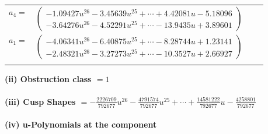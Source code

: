 \documentclass[1p]{elsarticle_modified}
\theoremstyle{definition}
\begin{document}
\begin{tabular}{m{7pt} m{180pt} m{7pt} m{180pt} }
\flushright $a_{4}=$&$\begin{pmatrix}-1.09427 u^{26}-3.45639 u^{25}+\cdots+4.42081 u-5.18096\\-3.64276 u^{26}-4.52291 u^{25}+\cdots-13.9435 u+3.89601\end{pmatrix}$ \\
\flushright $a_{1}=$&$\begin{pmatrix}-4.06341 u^{26}-6.40875 u^{25}+\cdots-8.28744 u+1.23141\\-2.48321 u^{26}-3.27273 u^{25}+\cdots-10.3527 u+2.66927\end{pmatrix}$\\&\end{tabular}
\flushleft \textbf{(ii) Obstruction class $= 1$}\\~\\
\flushleft \textbf{(iii) Cusp Shapes $= -\frac{2226709}{792677} u^{26}-\frac{4791574}{792677} u^{25}+\cdots+\frac{14581222}{792677} u-\frac{4258801}{792677}$}\\~\\
\newpage\renewcommand{\arraystretch}{1}
\flushleft \textbf{(iv) u-Polynomials at the component}\newline \\
\end{document}
